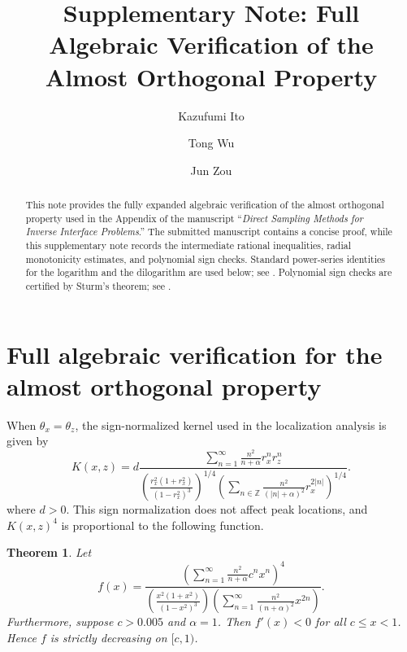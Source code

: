 ﻿\documentclass[10pt]{article}
\title{Supplementary Note: Full Algebraic Verification of the Almost Orthogonal Property}
\author{Kazufumi Ito \and Tong Wu \and Jun Zou}
\date{}
\newtheorem{theorem}{Theorem}
\begin{document}
\maketitle

\begin{abstract}
This note provides the fully expanded algebraic verification of the almost
orthogonal property used in the Appendix of the manuscript
``\emph{Direct Sampling Methods for Inverse Interface Problems}.'' The submitted manuscript
contains a concise proof, while this supplementary note records the intermediate
rational inequalities, radial monotonicity estimates, and polynomial sign
checks. Standard power-series identities for the logarithm and the dilogarithm
are used below; see
\cite[Sec.~25.12]{NIST:DLMF}. Polynomial sign checks are certified by Sturm's
theorem; see \cite[Sec.~2.2.2]{basu2006algorithms}.
\end{abstract}
\section{Full algebraic verification for the almost orthogonal property}
When $\theta_x = \theta_z$, the sign-normalized kernel used in the localization analysis is given by
\begin{equation}
    K(x,z) = d\frac{\sum_{n=1}^{\infty}\frac{n^{2}}{n+\alpha}r_{x}^{n}r_{z}^{n}}{\left(\frac{r_{x}^{2}(1+r_{x}^{2})}{(1-r_{x}^{2})^{3}}\right)^{1/4}\left(\sum_{n\in\mathbb{Z}}\frac{n^{2}}{(|n|+\alpha)^{2}}r_{x}^{2|n|}\right)^{1/4}}.
\end{equation}
where $d>0$. This sign normalization does not affect peak locations, and $K(x,z)^4$ is proportional to the following function.

\begin{theorem}
Let $$f(x) = \frac{\left(\sum_{n=1}^{\infty}\frac{n^{2}}{n+\alpha}c^{n}x^{n}\right)^{4}}{\left(\frac{x^{2}(1+x^{2})}{(1-x^{2})^{3}}\right)\left(\sum_{n=1}^{\infty}\frac{n^{2}}{(n+\alpha)^{2}}x^{2n}\right)}.$$
Furthermore, suppose $c>0.005$ and $\alpha=1$. Then $f'(x)<0$
for all $c\leq x<1$. Hence $f$ is strictly decreasing on $[c,1)$.
\end{theorem}
\end{document}
